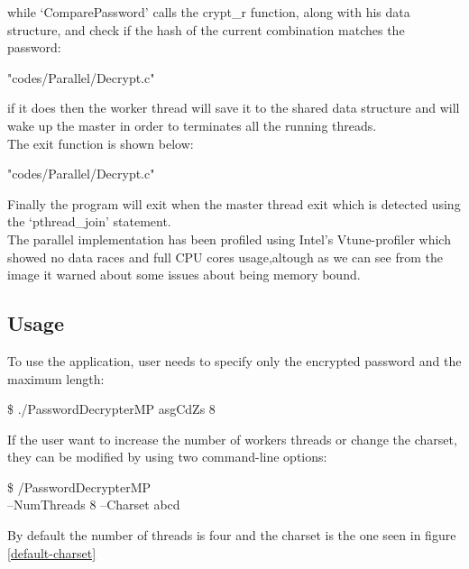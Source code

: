\documentclass[10pt,twocolumn,letterpaper]{article}
\newenvironment{Shaded}{}{}
\newcommand{\ExtensionTok}[1]{#1}
\newcommand{\NormalTok}[1]{#1}
\begin{document}
while `ComparePassword' calls the crypt\_r function, along with his data structure, and check if the hash of the current 
combination matches the password:\\
\begin{lstinputlisting}[language=C,style=CSnippetStyle,caption=Compare Password Function,firstline=35,lastline=40]
		{"codes/Parallel/Decrypt.c"}
\end{lstinputlisting}
if it does then the worker thread will save it to the shared data structure and will wake up the master in order to terminates all the
running threads.\\
The exit function is shown below:\\
\begin{lstinputlisting}[language=C,style=CSnippetStyle,caption=Worker Exit Function,firstline=88,lastline=98]
		{"codes/Parallel/Decrypt.c"}
\end{lstinputlisting}
Finally the program will exit when the master thread exit which is detected using the `pthread\_join' statement.\\
The parallel implementation has been profiled using Intel's Vtune-profiler which showed no data races and full CPU cores usage,altough
as we can see from the image it warned about some issues about being memory bound.\\
\subsection{Usage}
To use the application, user needs to specify only the encrypted password and the maximum length:\\
\begin{Shaded}
\begin{Highlighting}[]
\NormalTok{\$ }\ExtensionTok{./PasswordDecrypterMP asgCdZs 8}
\end{Highlighting}
\end{Shaded}
If the user want to increase the number of workers threads or change the charset, they can be modified by using two command-line 
options:\\
\begin{Shaded}
\begin{Highlighting}[]
\NormalTok{\$ }/PasswordDecrypterMP \\
--NumThreads 8 --Charset abcd
\end{Highlighting}
\end{Shaded}
By default the number of threads is four and the charset is the one seen in figure \ref{default-charset}
\end{document}
